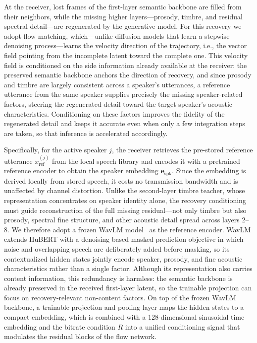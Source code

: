 \documentclass[lettersize,journal]{IEEEtran}
\begin{document}
At the receiver, lost frames of the first-layer semantic backbone are filled from their neighbors, while the missing higher layers---prosody, timbre, and residual spectral detail---are regenerated by the generative model. For this recovery we adopt flow matching, which---unlike diffusion models that learn a stepwise denoising process---learns the velocity direction of the trajectory, i.e., the vector field pointing from the incomplete latent toward the complete one. This velocity field is conditioned on the side information already available at the receiver: the preserved semantic backbone anchors the direction of recovery, and since prosody and timbre are largely consistent across a speaker's utterances, a reference utterance from the same speaker supplies precisely the missing speaker-related factors, steering the regenerated detail toward the target speaker's acoustic characteristics. Conditioning on these factors improves the fidelity of the regenerated detail and keeps it accurate even when only a few integration steps are taken, so that inference is accelerated accordingly.

Specifically, for the active speaker $j$, the receiver retrieves the pre-stored reference utterance $x_{\mathrm{ref}}^{(j)}$ from the local speech library and encodes it with a pretrained reference encoder to obtain the speaker embedding $\mathbf{e}_{\mathrm{spk}}$. Since the embedding is derived locally from stored speech, it costs no transmission bandwidth and is unaffected by channel distortion. Unlike the second-layer timbre teacher, whose representation concentrates on speaker identity alone, the recovery conditioning must guide reconstruction of the full missing residual---not only timbre but also prosody, spectral fine structure, and other acoustic detail spread across layers 2--8. We therefore adopt a frozen WavLM model~\cite{chen2022wavlm} as the reference encoder. WavLM extends HuBERT with a denoising-based masked prediction objective in which noise and overlapping speech are deliberately added before masking, so its contextualized hidden states jointly encode speaker, prosody, and fine acoustic characteristics rather than a single factor. Although its representation also carries content information, this redundancy is harmless: the semantic backbone is already preserved in the received first-layer latent, so the trainable projection can focus on recovery-relevant non-content factors. On top of the frozen WavLM backbone, a trainable projection and pooling layer maps the hidden states to a compact embedding, which is combined with a 128-dimensional sinusoidal time embedding and the bitrate condition $R$ into a unified conditioning signal that modulates the residual blocks of the flow network.
\end{document}
